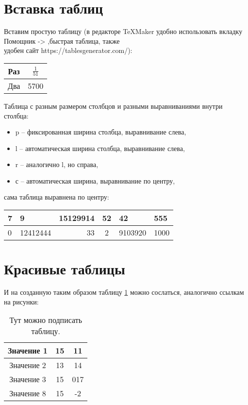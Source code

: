 \documentclass[a4paper, 12pt]{article}
\begin{document}
\section{Вставка таблиц}

Вставим простую таблицу (в редакторе TeXMaker удобно использовать вкладку Помощник -> ,быстрая таблица, также \\ удобен сайт https://tablesgenerator.com/):

\begin{tabular}{|c|c|}
\hline 
Раз & $\frac{1}{51}$ \\  \hline 
Два & 5700 \\  \hline 
\end{tabular} 

Таблица с разным размером столбцов и разными выравниваниями внутри столбца:
\begin{itemize}
	\item p -- фиксированная ширина столбца, выравнивание слева,
	\item l -- автоматическая ширина столбца, выравнивание слева,
	\item r -- аналогично l, но справа,
	\item с -- автоматическая ширина, выравнивание по центру,
\end{itemize}
сама таблица выравнена по центру:
\begin{center}
\begin{tabular}{|p{2cm}|l|r|c|p{90pt}|p{}|}
\hline 
7 & 9 & 15129914 & 52 & 42 & 555 \\ 
\hline 
0 & 12412444 & 33 & 2 & 9103920 & 1000 \\ 
\hline 
\end{tabular} 
\end{center}

\section{Красивые таблицы}
И на созданную таким образом таблицу \ref{our_table} можно сослаться, аналогично ссылкам на рисунки:

\begin{table}[h!]
    \centering
    \caption{Тут можно подписать таблицу.}\label{our_table}
	\begin{tabular}{ |c|c|c|}
 \hline
 Значение 1 & 15 & 11 \\ \hline
 Значение 2 & 13 & 14\\ \hline
 Значение 3 & 15 & 017 \\ \hline
 Значение 8 & 15 & -2 \\ \hline
	\end{tabular}
\end{table}
\end{document}
